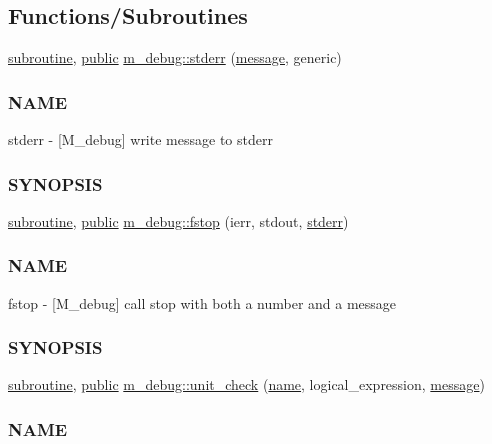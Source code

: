 \subsection*{Functions/\+Subroutines}
\begin{DoxyCompactItemize}
\item 
\hyperlink{M__stopwatch_83_8txt_acfbcff50169d691ff02d4a123ed70482}{subroutine}, \hyperlink{M__stopwatch_83_8txt_a2f74811300c361e53b430611a7d1769f}{public} \hyperlink{namespacem__debug_ad59ade4de861dcf4e007521b2cf2f304}{m\+\_\+debug\+::stderr} (\hyperlink{M__stopwatch_83_8txt_aa4313e9a55405841f95e6550cd87fc3b}{message}, generic)
\begin{DoxyCompactList}\small\item\em \subsubsection*{N\+A\+ME}

stderr -\/ \mbox{[}M\+\_\+debug\mbox{]} write message to stderr \subsubsection*{S\+Y\+N\+O\+P\+S\+IS}\end{DoxyCompactList}\item 
\hyperlink{M__stopwatch_83_8txt_acfbcff50169d691ff02d4a123ed70482}{subroutine}, \hyperlink{M__stopwatch_83_8txt_a2f74811300c361e53b430611a7d1769f}{public} \hyperlink{namespacem__debug_a66fa03a6a97837acc4c1265be1294295}{m\+\_\+debug\+::fstop} (ierr, stdout, \hyperlink{M__io_8f90_a448cccd08d4d6bce645ffbbf14cdfa7e}{stderr})
\begin{DoxyCompactList}\small\item\em \subsubsection*{N\+A\+ME}

fstop -\/ \mbox{[}M\+\_\+debug\mbox{]} call stop with both a number and a message \subsubsection*{S\+Y\+N\+O\+P\+S\+IS}\end{DoxyCompactList}\item 
\hyperlink{M__stopwatch_83_8txt_acfbcff50169d691ff02d4a123ed70482}{subroutine}, \hyperlink{M__stopwatch_83_8txt_a2f74811300c361e53b430611a7d1769f}{public} \hyperlink{namespacem__debug_a0ae797092ab85a8ba9258dc9f8949189}{m\+\_\+debug\+::unit\+\_\+check} (\hyperlink{M__stopwatch_83_8txt_a3f508a893ae4c3b397b4383e33b9bcae}{name}, logical\+\_\+expression, \hyperlink{M__stopwatch_83_8txt_aa4313e9a55405841f95e6550cd87fc3b}{message})
\begin{DoxyCompactList}\small\item\em \subsubsection*{N\+A\+ME}


\end{DoxyCompactList}
\end{DoxyCompactItemize}
